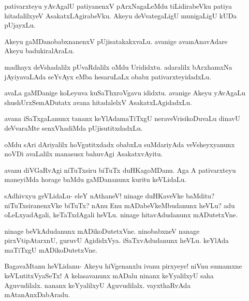 \documentclass{article}
\begin{document}
\begin{mng}%
pativarxteyu yAvAgalU patiyanenxV pArxNagaLeMdu tiLidirabeVku patiya hitadalilxyeV AsakatxLAgirabeVku. Akeyu deVvategaLigU
munigaLigU kUDa pUjayxLu.
\end{mng}

\begin{mng}%
Akeyu gaMDanobabxnanenxV pUjisatakakxvaLu. avanige avamAnavAdare
Akeyu badukiralAraLu.
\end{mng}

\begin{mng}%
madhayx deVshadalilx pUvaRdalilx oMdu Urididxtu. adaralilx bArxhamxNa
jAyiyavaLAda seYvAyx eMba hesaruLaLx obabx pativarxteyidadxLu.
\end{mng}

\begin{mng}%
avaLa gaMDanige koLeyuva kuSaThxroVgavu ididxtu. avanige
Akeyu yAvAgaLu shushUrxSemADutatx avana hitadalelxV AsakatxLAgidadxLu.
\end{mng}

\begin{mng}%
avana iSaTxgaLanunx tananx keYlAdamaTiTxgU neraveVrisikoDuvaLu
dinavU deVvaraMte senxVhadiMda pUjisutitxdadxLu.
\end{mng}

\begin{mng}%
oMdu sAri dAriyalilx hoVgutitxdadx obabxLu suMdariyAda
veVsheyxyanunx noVDi avaLalilx manasusx bahuvAgi AsakatxvAyitu.
\end{mng}

\begin{mng}%
avanu diVGaRvAgi niTuTxsiru biTuTx duHKagoMDanu. Aga A 
pativarxteyu maneyiMda horage baMdu gaMDananunx kuritu keVLidaLu.
\end{mng}

\begin{mng}%
sAdhivxyu geVLidaLu- eleY nAthaneV! ninage duHKaveVke
baMditu? niTuTxsiranenxVke biTuTx? nAnu Enu mADabeVkeMbudanunx heVLu?
adu oLeLxyadAgali, keTaTxdAgali heVLu. ninage hitavAdudanunx mADutetxVne.
\end{mng}

\begin{mng}%
ninage beVkAdudanunx mADikoDutetxVne. ninobabxneV nanage
pirxVtipAtarxnU, guruvU AgididxVya. iSaTxvAdudanunx heVLu. keYlAda
maTiTxgU mADikoDutetxVne.
\end{mng}

\begin{mng}%
BagavaMtanu heVLidanu- Akeyu hiVgenanxlu ivanu pirxyeye!
niVnu sumamxne keVLutitxVyaSeTx! A kelasavanunx mADalu ninanx keYyalilxyU
saha Aguvudilalx. nananx keYyalilxyU Aguvudilalx. vayxthaRvAda mAtanAnxDabAradu.
\end{mng}
\end{document}
